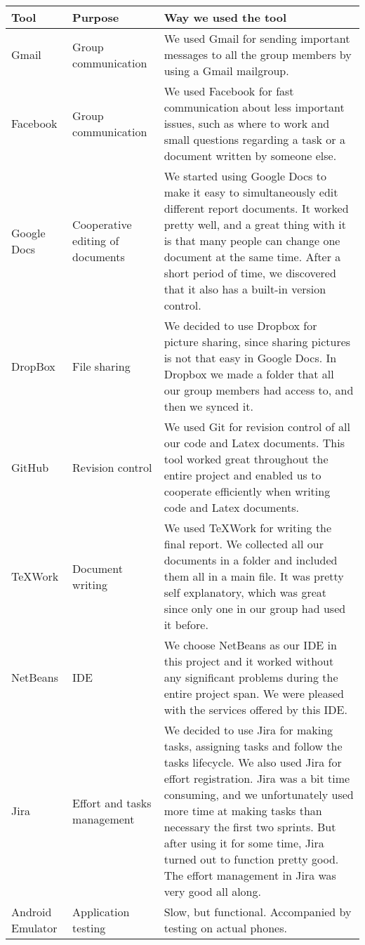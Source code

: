 \begin{tabularx}{\linewidth}{>{\setlength\hsize{.3\hsize}}X|>{\setlength\hsize{0.5\hsize}}X|>{\setlength\hsize{1\hsize}}X}
\textbf{Tool} & \textbf{Purpose} & \textbf{Way we used the tool} \\ \hline \hline

Gmail & Group communication &We used Gmail for sending important messages to all the group members by using a Gmail mailgroup.\\ \hline

Facebook & Group communication &We used Facebook for fast communication about less important issues, such as where to work and small questions regarding a task or a document written by someone else.\\ \hline

Google Docs &Cooperative editing of documents &We started using Google Docs to make it easy to simultaneously edit different report documents. It worked pretty well, and a great thing with it is that many people can change one document at the same time. After a short period of time, we discovered that it also has a built-in version control.\\ \hline

DropBox & File sharing &We decided to use Dropbox for picture sharing, since sharing pictures is not that easy in Google Docs. In Dropbox we made a folder that all our group members had access to, and then we synced it.\\ \hline

GitHub &  Revision control&We used Git for revision control of all our code and Latex documents. This tool worked great throughout the entire project and enabled us to cooperate efficiently when writing code and Latex documents.\\ \hline

TeXWork & Document writing &We used TeXWork for writing the final report. We collected all our documents in a folder and included them all in a main file. It was pretty self explanatory, which was great since only one in our group had used it before.\\ \hline

NetBeans & IDE & We choose NetBeans as our IDE in this project and it worked without any significant problems during the entire project span. We were pleased with the services offered by this IDE.\\ \hline

Jira& Effort and tasks management&We decided to use Jira for making tasks, assigning tasks and follow the tasks lifecycle. We also used Jira for effort registration. Jira was a bit time consuming, and we unfortunately used more time at making tasks than necessary the first two sprints. But after using it for some time, Jira turned out to function pretty good. The effort management in Jira was very good all along. \\ \hline

Android Emulator &Application testing & Slow, but functional. Accompanied by testing on actual phones.\\ \hline

\end{tabularx}
	
